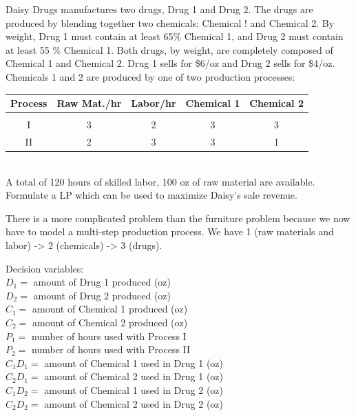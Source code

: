 \documentclass{article}
\begin{document}
\begin{eg}
    Daisy Drugs manufactures two drugs, Drug 1 and Drug 2. The drugs are produced
    by blending together two chemicals: Chemical ! and Chemical 2. By weight,
    Drug 1 must contain at least 65\% Chemical 1, and Drug 2 must contain at least
    55 \% Chemical 1. Both drugs, by weight, are completely composed of Chemical 1
    and Chemical 2. Drug 1 sells for \$6/oz and Drug 2 sells for \$4/oz. Chemicals  1
    and 2 are produced by one of two production processes: \\
    \begin{tabular}
        { |c | c | c | c |c | } 
        \hline
        Process & Raw Mat./hr & Labor/hr & Chemical 1 & Chemical 2 \\
        \hline \\
        I & 3 & 2 & 3 & 3 \\
        \hline 
        II & 2 & 3 & 3 & 1 \\
        \hline
    \end{tabular} \\

    A total of 120 hours of skilled labor, 100 oz of raw material are available. 
    Formulate a LP which can be used to maximize Daisy's sale revenue. 
    \begin{remark}
        There is a more complicated problem than the furniture problem because 
        we now have to model a multi-step production process. We have 1 (raw materials 
        and labor) -> 2 (chemicals) -> 3 (drugs).
    \end{remark}

    Decision variables: \\
    \(D_1=\) amount of Drug 1 produced (oz) \\
    \(D_2=\) amount of Drug 2 produced (oz) \\
    \(C_1=\) amount of Chemical 1 produced (oz) \\
    \(C_2=\) amount of Chemical 2 produced (oz) \\
    \(P_1=\) number of hours used with Process I \\
    \(P_2=\) number of hours used with Process II \\ 
    \(C_1D_1=\) amount of Chemical 1 used in Drug 1 (oz) \\
    \(C_2D_1=\) amount of Chemical 2 used in Drug 1 (oz) \\
    \(C_1D_2=\) amount of Chemical 1 used in Drug 2 (oz) \\
    \(C_2D_2=\) amount of Chemical 2 used in Drug 2 (oz) \\  


\end{eg}
\end{document}
